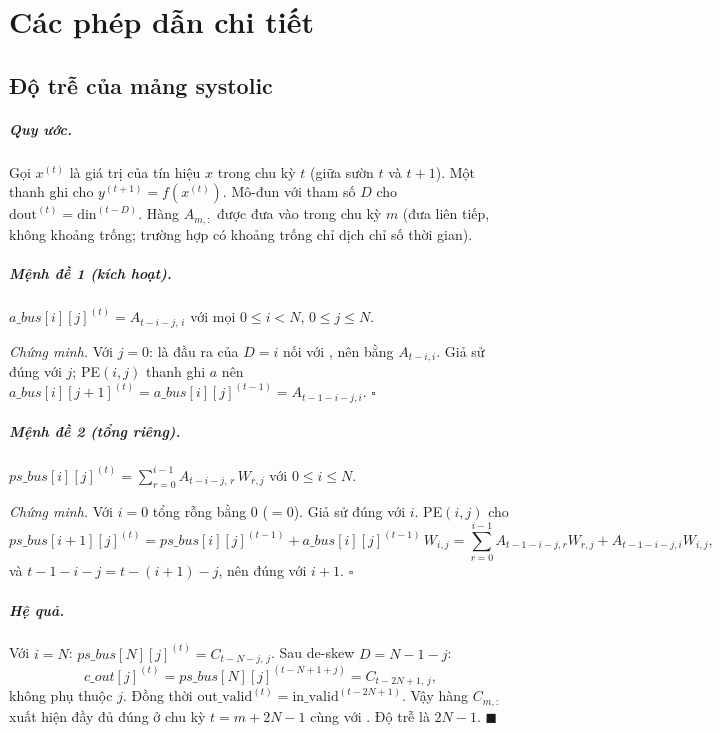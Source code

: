 \chapter{Các phép dẫn chi tiết}
\label{app:derivations}

\section{Độ trễ của mảng systolic}
\label{app:latency}
\paragraph{Quy ước.} Gọi $x^{(t)}$ là giá trị của tín hiệu $x$ trong chu kỳ $t$ (giữa sườn $t$ và $t+1$). Một thanh ghi cho $y^{(t+1)}=f(x^{(t)})$. Mô-đun  với tham số $D$ cho $\text{dout}^{(t)}=\text{din}^{(t-D)}$. Hàng $A_{m,:}$ được đưa vào  trong chu kỳ $m$ (đưa liên tiếp, không khoảng trống; trường hợp có khoảng trống chỉ dịch chỉ số thời gian).

\paragraph{Mệnh đề 1 (kích hoạt).} $a\_bus[i][j]^{(t)} = A_{t-i-j,\,i}$ với mọi $0\le i<N$, $0\le j\le N$.

\emph{Chứng minh.} Với $j=0$:  là đầu ra của  $D=i$ nối với , nên bằng $A_{t-i,i}$. Giả sử đúng với $j$; PE$(i,j)$ thanh ghi $a$ nên $a\_bus[i][j+1]^{(t)}=a\_bus[i][j]^{(t-1)}=A_{t-1-i-j,i}$. $\square$

\paragraph{Mệnh đề 2 (tổng riêng).} $ps\_bus[i][j]^{(t)} = \sum_{r=0}^{i-1} A_{t-i-j,\,r}\,W_{r,j}$ với $0\le i\le N$.

\emph{Chứng minh.} Với $i=0$ tổng rỗng bằng 0 ($=0$). Giả sử đúng với $i$. PE$(i,j)$ cho
\[
ps\_bus[i+1][j]^{(t)} = ps\_bus[i][j]^{(t-1)} + a\_bus[i][j]^{(t-1)}\,W_{i,j}
= \sum_{r=0}^{i-1}A_{t-1-i-j,r}W_{r,j} + A_{t-1-i-j,i}W_{i,j},
\]
và $t-1-i-j=t-(i+1)-j$, nên đúng với $i+1$. $\square$

\paragraph{Hệ quả.} Với $i=N$: $ps\_bus[N][j]^{(t)} = C_{t-N-j,\,j}$. Sau de-skew $D=N-1-j$:
\[
c\_out[j]^{(t)} = ps\_bus[N][j]^{(t-N+1+j)} = C_{t-2N+1,\,j},
\]
không phụ thuộc $j$. Đồng thời $\text{out\_valid}^{(t)}=\text{in\_valid}^{(t-2N+1)}$. Vậy hàng $C_{m,:}$ xuất hiện đầy đủ đúng ở chu kỳ $t=m+2N-1$ cùng với . Độ trễ là $2N-1$. $\blacksquare$

